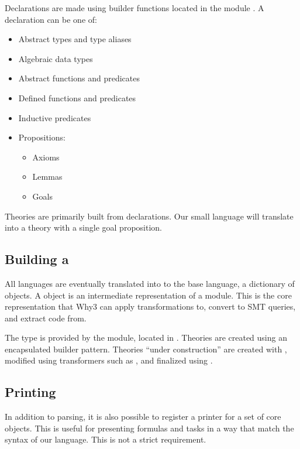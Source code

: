Declarations are made using builder functions located in the module .
A declaration can be one of:

\begin{itemize}
    \item Abstract types and type aliases
    \item Algebraic data types
    \item Abstract functions and predicates
    \item Defined functions and predicates
    \item Inductive predicates
    \item Propositions:
    \begin{itemize}
        \item Axioms
        \item Lemmas
        \item Goals
    \end{itemize}
\end{itemize}

Theories are primarily built from declarations.
Our small language will translate into a theory with a single goal proposition.

\subsection{Building a }

All languages are eventually translated into to the base language,
a dictionary of  objects.
A  object is an intermediate representation of a module.
This is the core representation that Why3 can apply transformations to,
convert to SMT queries, and extract code from.

The  type is provided by the  module,
located in .
Theories are created using an encapsulated builder pattern.
Theories ``under construction'' are  created with ,
modified using transformers such as ,
and finalized using .

\subsection{Printing}

In addition to parsing,
it is also possible to register a printer for a set of core objects.
This is useful for presenting formulas and tasks in a way that match the syntax of our language.
This is not a strict requirement.
